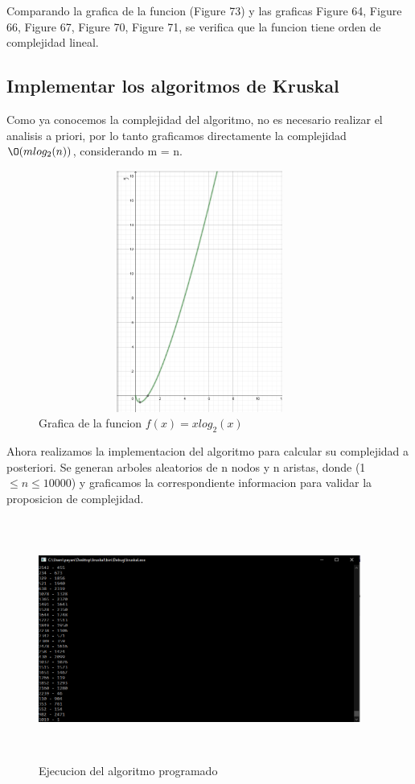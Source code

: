 \documentclass[spanish]{article}
\begin{document}
	Comparando la grafica de la funcion (Figure 73) y las graficas Figure 64, Figure 66, Figure 67, Figure 70, Figure 71, se verifica que la funcion tiene orden de complejidad lineal.
	\subsection{Implementar los algoritmos de Kruskal}
	Como ya conocemos la complejidad del algoritmo, no es necesario realizar el analisis a priori, por lo tanto graficamos directamente la complejidad $\O(mlog_2(n))$, considerando m = n.
	\begin{figure}[H]
		\centering
		\includegraphics[width=400px,height=300px]{grafica11}
		\caption{Grafica de la funcion $f(x) = xlog_2(x)$  }
	\end{figure}
	Ahora realizamos la implementacion del algoritmo para calcular su complejidad a posteriori. Se generan arboles aleatorios de n nodos y n aristas, donde (1$\leq n\leq 10000$) y graficamos la correspondiente informacion para validar la proposicion de complejidad.
	\begin{figure}[H]
		\centering
		\includegraphics[width=400px,height=300px]{captura62}
		\caption{Ejecucion del algoritmo programado}
	\end{figure}
\end{document}

